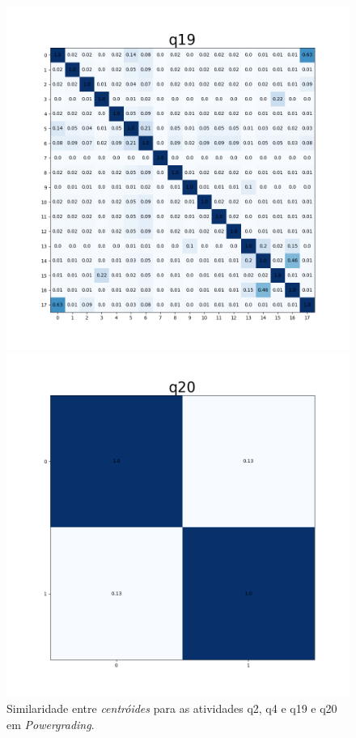 \begin{figure}[!h]
\begin{minipage}[t]{.5\textwidth}
\end{minipage}%
\hfill
\begin{minipage}[t]{.5\textwidth}
\centering
\includegraphics[width=\textwidth]{figuras/hmq19.png}
\end{minipage}%
\begin{minipage}[t]{.5\textwidth}
\centering
\includegraphics[width=\textwidth]{figuras/hmq20.png}
\end{minipage}
\caption{Similaridade entre \textit{centróides} para as atividades q2, q4 e q19 e q20 em \textit{Powergrading}.}
\label{fig-hmPowergrading}
\end{figure}

